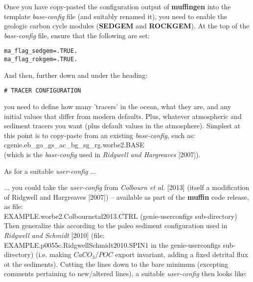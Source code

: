\documentclass[11pt,fleqn]{book} %
\begin{document}
Once you have copy-pasted the configuration output of \textbf{muffingen} into the template \textit{base-config} file (and suitably renamed it), you need to enable the geologic carbon cycle modules (\textbf{SEDGEM} and \textbf{ROCKGEM}). At the top of the \textit{base-config} file, ensure that the following are set:
\vspace{-1mm}\small\begin{verbatim}
ma_flag_sedgem=.TRUE.
ma_flag_rokgem=.TRUE.
\end{verbatim}\normalsize\vspace{-1mm}
And then, further down and under the heading:
\vspace{-1mm}\small\begin{verbatim}
# TRACER CONFIGURATION
\end{verbatim}\normalsize\vspace{-1mm}
you need to define how many 'tracers' in the ocean, what they are, and any initial values that differ from modern defaults. Plus, whatever atmospheric and sediment tracers you want (plus default values in the atmosphere). Simplest at this point is to copy-paste from an existing \textit{base-config}, such as:
\vspace{1mm}
\\\textsf{\footnotesize cgenie.eb\_go\_gs\_ac\_bg\_sg\_rg.worbe2.BASE}
\vspace{1mm}
\\(which is the \textit{base-config} used in \textit{Ridgwell and Hargreaves} [2007]).

\vspace{1mm}
As for a suitable \textit{user-config} ...

\vspace{12mm}
\pagebreak 

... you could take the \textit{user-config} from \textit{Colbourn et al.} [2013] (itself a modification of Ridgwell and Hargreaves [2007]) -- available as part of the \textbf{muffin} code release, as file:
\vspace{1mm}
\\\textsf{\footnotesize EXAMPLE.worbe2.Colbournetal2013.CTRL } (\textsf{\footnotesize genie-userconfigs } sub-directory)
\vspace{1mm}
\\Then generalize this according to the paleo sediment configuration used in \textit{Ridgwell and Schmidt} [2010] (file: \textsf{\footnotesize EXAMPLE.p0055c.RidgwellSchmidt2010.SPIN1 } in the \textsf{\footnotesize genie-userconfigs } sub-directory) (i.e. making \(CaCO_{3}/POC\) export invariant, adding a fixed detrital flux ot the sediments). Cutting the lines down to the bare minimum (excepting comments pertaining to new/altered lines), a suitable \textit{user-config} then looks like:
\end{document}
